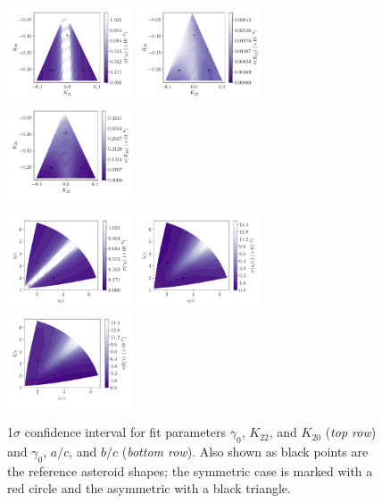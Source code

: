 \documentclass[fleqn,usenatbib]{mnras}
\begin{document}
\begin{figure}
  \includegraphics[width=0.33\textwidth]{figs/probe-space-theta-1-sigma.pdf}\hfill
  \includegraphics[width=0.33\textwidth]{figs/probe-space-theta-2-sigma.pdf}\hfill
  \includegraphics[width=0.33\textwidth]{figs/probe-space-theta-3-sigma.pdf}

  \includegraphics[width=0.33\textwidth]{figs/probe-space-ab-1-sigma.pdf}\hfill
  \includegraphics[width=0.33\textwidth]{figs/probe-space-ab-a-sigma.pdf}\hfill
  \includegraphics[width=0.33\textwidth]{figs/probe-space-ab-b-sigma.pdf}

  \caption{1$\sigma$ confidence interval for fit parameters $\gamma_0$, $K_{22}$, and $K_{20}$ (\textit{top row}) and $\gamma_0$, $a/c$, and $b/c$ (\textit{bottom row}). Also shown as black points are the reference asteroid shapes; the symmetric case is marked with a red circle and the asymmetric with a black triangle.}
  \label{fig:scan-space-sigma}
\end{figure}
\end{document}
